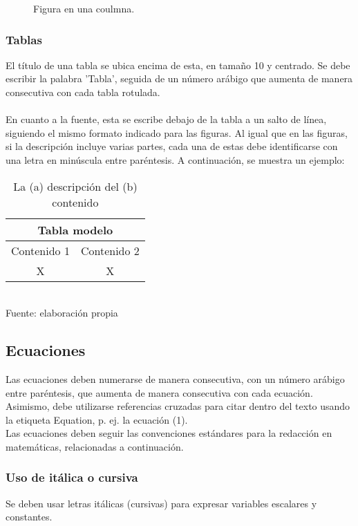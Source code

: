 \documentclass[10pt,letterpaper,twoside,twocolumn]{article}   %
\begin{document}
\begin{figure}
  \centering
  \caption{Figura en una coulmna.}
\end{figure}

\subsubsection{Tablas}
El título de una tabla se ubica encima de esta, en tamaño 10 y centrado. Se debe escribir la palabra 'Tabla', seguida de un número arábigo que aumenta de manera consecutiva con cada tabla rotulada. \\
\\
En cuanto a la fuente, esta se escribe debajo de la tabla a un salto de línea, siguiendo el mismo formato indicado para las figuras. Al igual que en las figuras, si la descripción incluye varias partes, cada una de estas debe identificarse con una letra en minúscula entre paréntesis. A continuación, se muestra un ejemplo:\\

\begin{table}[H]
    \caption{La (a) descripción del (b) contenido}
    \centering
    \begin{tabular}{c c }
        \hline
        \multicolumn{2}{c}{\textbf{Tabla modelo}} \\
        \hline
        Contenido 1 & Contenido 2 \\
        \hline
        X & X \\
        \hline
    \end{tabular}
    \label{tab:Tabla Ejemplo}\\
    Fuente: elaboración propia
\end{table}
\subsection{Ecuaciones}
Las ecuaciones deben numerarse de manera consecutiva, con un número arábigo entre paréntesis, que aumenta de manera consecutiva con cada ecuación. Asimismo, debe utilizarse referencias cruzadas para citar dentro del texto usando la etiqueta Equation, p. ej. la ecuación (1).
\\
Las ecuaciones deben seguir las convenciones estándares para la redacción en matemáticas, relacionadas a continuación.
\subsubsection{Uso de itálica o cursiva}
Se deben usar letras itálicas (cursivas) para expresar variables escalares y constantes. 
\end{document}
